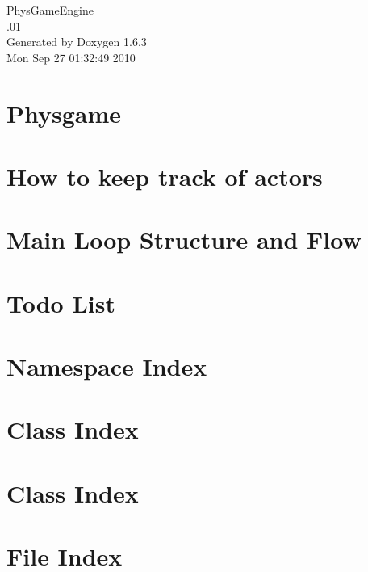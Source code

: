 \documentclass[a4paper]{book}
\begin{document}
\hypersetup{pageanchor=false}
\begin{titlepage}
\vspace*{7cm}
\begin{center}
{\Large PhysGameEngine \\[1ex]\large .01 }\\
\vspace*{1cm}
{\large Generated by Doxygen 1.6.3}\\
\vspace*{0.5cm}
{\small Mon Sep 27 01:32:49 2010}\\
\end{center}
\end{titlepage}
\clearemptydoublepage
{}
\tableofcontents
\clearemptydoublepage
{}
\hypersetup{pageanchor=true}
\chapter{Physgame}
\label{index}\hypertarget{index}{}
\chapter{How to keep track of actors}
\label{actorcontainer1}
\hypertarget{actorcontainer1}{}

\chapter{Main Loop Structure and Flow}
\label{mainloop1}
\hypertarget{mainloop1}{}

\chapter{Todo List}
\label{todo}
\hypertarget{todo}{}

\chapter{Namespace Index}

\chapter{Class Index}

\chapter{Class Index}

\chapter{File Index}

\end{document}
